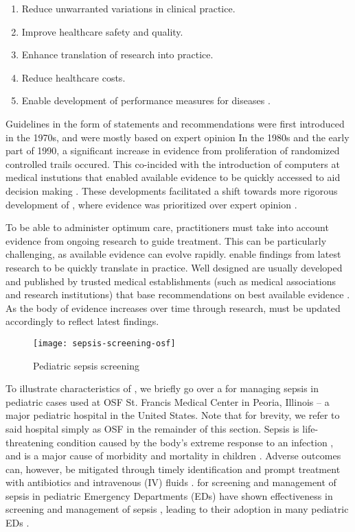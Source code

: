 \begin{enumerate}
  \item Reduce unwarranted variations in clinical practice.
  \item Improve healthcare safety and quality.
  \item Enhance translation of research into practice.
  \item Reduce healthcare costs.
  \item Enable development of performance measures for diseases
    \cite{GuerraInjury23, BusseWHO19}.
\end{enumerate}

Guidelines in the form of statements and recommendations
were first introduced in the 1970s,
and were mostly based on expert opinion
In the 1980s and the early part of 1990,
a significant increase in evidence from proliferation of randomized controlled
trails occured. This co-incided with the introduction
of computers at medical instutions that enabled available evidence
to be quickly accessed to aid decision making \cite{GuyattAMA92,SackettJPH95}.
These developments facilitated a shift towards more rigorous
development of \BPGs{}, where evidence was prioritized over expert opinion
\cite{GuerraInjury23}.

To be able to administer optimum care, practitioners must take into
account evidence from ongoing research to guide treatment. This
can be particularly challenging, as available evidence can evolve rapidly.
\BPGs{} enable findings from latest research to be quickly translate in
practice. Well designed \BPGs{} are usually developed and published by trusted medical
establishments (such as medical associations and research institutions)
that base recommendations on best available evidence \cite{GuerraInjury23}.
As the body of evidence increases over time through research,
\BPGs{} must be updated accordingly to reflect latest findings.

\begin{figure}[t]
  \centering
  \texttt{[image: sepsis-screening-osf]}
  \caption{Pediatric sepsis screening \BPG{}}\label{fig:sepsis-screening}
\end{figure}

To illustrate characteristics of \BPGs{}, we briefly go over a \BPG{}
for managing sepsis in pediatric cases used at OSF St. Francis Medical Center
in Peoria, Illinois -- a major pediatric hospital in the United States. Note
that for brevity, we refer to said hospital simply as OSF in the remainder of
this section.
Sepsis is life-threatening condition caused by the body's extreme response to
an infection \cite{RhodesICM17}, and is
a major cause of morbidity and mortality in children \cite{Eisenberg2021JP}.
Adverse outcomes can, however, be mitigated through timely
identification and prompt treatment with antibiotics and
intravenous (IV) fluids \cite{Weiss2014CCM,Evans2018JAMA}.
\BPGs{} for screening and management of sepsis in pediatric Emergency
Departments (EDs) have shown effectiveness in screening and management of sepsis \cite{Eisenberg2021JP},
leading to their adoption in many pediatric EDs \cite{Balamuth2017EM,Sepanski2014FP}.

